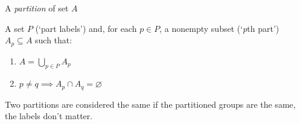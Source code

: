 A \emph{partition} of set $A$

A set $P$ (`part labels') and, for each $p \in P$, a nonempty subset (`\emph{p}th part') $A_p \subseteq A$ such that:
  \begin{enumerate}
    \item $A = \bigcup_{p \in P}A_p$
    \item $p \ne q \implies A_p \cap A_q = \varnothing$
  \end{enumerate}
  Two partitions are considered the same if the partitioned groups are the same, the labels don't matter.